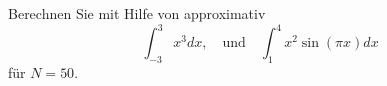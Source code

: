 \begin{aufg}[0]
Berechnen Sie mit Hilfe von  approximativ
\[ \int_{-3}^3 x^3 dx, \quad \text{und} \quad \int_1^{4} x^2 \sin ( \pi x) dx\]
für $N=50$. 
\end{aufg}
